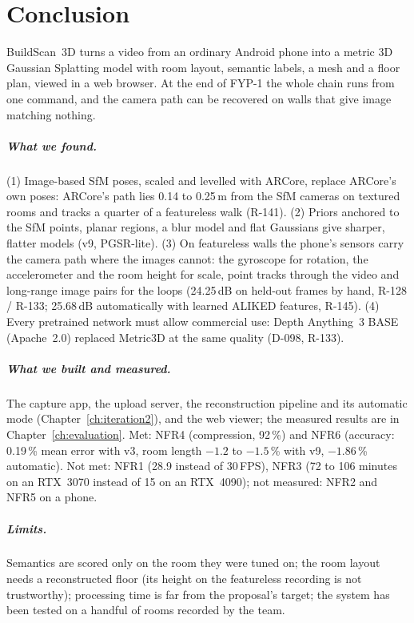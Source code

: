 \chapter{Conclusion}

BuildScan~3D turns a video from an ordinary Android phone into a metric 3D Gaussian Splatting model with room layout,
semantic labels, a mesh and a floor plan, viewed in a web browser. At the end of FYP-1 the whole chain runs from one
command, and the camera path can be recovered on walls that give image matching nothing.

\paragraph{What we found.} (1) Image-based SfM poses, scaled and levelled with ARCore, replace ARCore's own poses:
ARCore's path lies 0.14 to 0.25\,m from the SfM cameras on textured rooms and tracks a quarter of a featureless walk
(R-141). (2) Priors anchored to the SfM points, planar regions, a blur model and flat Gaussians give sharper, flatter
models (v9, PGSR-lite). (3) On featureless walls the phone's sensors carry the camera path where the images cannot:
the gyroscope for rotation, the accelerometer and the room height for scale, point tracks through the video and
long-range image pairs for the loops (24.25\,dB on held-out frames by hand, R-128 / R-133; 25.68\,dB automatically
with learned ALIKED features, R-145). (4) Every pretrained network must
allow commercial use: Depth Anything~3 BASE (Apache~2.0) replaced Metric3D at the same quality (D-098, R-133).

\paragraph{What we built and measured.} The capture app, the upload server, the reconstruction pipeline and its
automatic mode (Chapter~\ref{ch:iteration2}), and the web viewer; the measured results are in
Chapter~\ref{ch:evaluation}. Met: NFR4 (compression, 92\,\%) and NFR6 (accuracy: 0.19\,\% mean error with v3, room length $-1.2$ to $-1.5$\,\% with v9, $-1.86$\,\% automatic). Not met:
NFR1 (28.9 instead of 30\,FPS), NFR3 (72 to 106 minutes on an RTX~3070 instead of 15 on an RTX~4090); not measured:
NFR2 and NFR5 on a phone.

\paragraph{Limits.} Semantics are scored only on the room they were tuned on; the room layout needs a reconstructed
floor (its height on the featureless recording is not trustworthy); processing time is far from
the proposal's target; the system has been tested on a handful of rooms recorded by the team.
